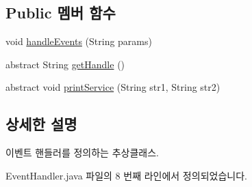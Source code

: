 \subsection*{Public 멤버 함수}
\begin{DoxyCompactItemize}
\item 
void \hyperlink{classserver_1_1event__handler_1_1_event_handler_a5d28300da533ce9dad96d26cc0aa8eda}{handle\-Events} (String params)
\item 
abstract String \hyperlink{classserver_1_1event__handler_1_1_event_handler_a11ebb67c402f4ce26cd18c3a0217f169}{get\-Handle} ()
\item 
abstract void \hyperlink{classserver_1_1event__handler_1_1_event_handler_afc87125b5bd2e5d255a4fd0af12bebcb}{print\-Service} (String str1, String str2)
\end{DoxyCompactItemize}


\subsection{상세한 설명}
이벤트 핸들러를 정의하는 추상클래스. 

Event\-Handler.\-java 파일의 8 번째 라인에서 정의되었습니다.



